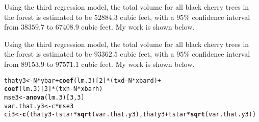 \documentclass[12pt]{article}\usepackage[]{graphicx}\usepackage[]{color}
\makeatletter
\newcommand{\hlnum}[1]{\textcolor[rgb]{0.686,0.059,0.569}{#1}}%
\newcommand{\hlopt}[1]{\textcolor[rgb]{0,0,0}{#1}}%
\newcommand{\hlstd}[1]{\textcolor[rgb]{0.345,0.345,0.345}{#1}}%
\newcommand{\hlkwb}[1]{\textcolor[rgb]{0.69,0.353,0.396}{#1}}%
\newcommand{\hlkwd}[1]{\textcolor[rgb]{0.737,0.353,0.396}{\textbf{#1}}}%
\newenvironment{kframe}{%
 \def\at@end@of@kframe{}%
 \ifinner\ifhmode%
  \def\at@end@of@kframe{\end{minipage}}%
  \begin{minipage}{\columnwidth}%
 \fi\fi%
 \def\FrameCommand##1{\hskip\@totalleftmargin \hskip-\fboxsep
 \colorbox{shadecolor}{##1}\hskip-\fboxsep
     \hskip-\linewidth \hskip-\@totalleftmargin \hskip\columnwidth}%
 \MakeFramed {\advance\hsize-\width
   \@totalleftmargin\z@ \linewidth\hsize
   \@setminipage}}%
 {\par\unskip\endMakeFramed%
 \at@end@of@kframe}
\newenvironment{knitrout}{}{} %
\makeatother
\begin{document}
\begin{doublespacing}
\begin{enumerate}
\begin{enumerate}
Using the third regression model, the total volume for all black cherry trees in the forest is estimated to be $52884.3$ cubic feet, with a $95\%$ confidence interval from $38359.7$ to $67408.9$ cubic feet. My work is shown below.


Using the third regression model, the total volume for all black cherry trees in the forest is estimated to be $93362.5$ cubic feet, with a $95\%$ confidence interval from $89153.9$ to $97571.1$ cubic feet. My work is shown below.

\begin{singlespace}
\begin{knitrout}\footnotesize
{}\color{fgcolor}\begin{kframe}
\begin{alltt}
\hlstd{thaty3} \hlkwb{<-} \hlstd{N} \hlopt{*} \hlstd{ybar} \hlopt{+} \hlkwd{coef}\hlstd{(lm.3)[}\hlnum{2}\hlstd{]} \hlopt{*} \hlstd{(txd} \hlopt{-} \hlstd{N} \hlopt{*} \hlstd{xbard)} \hlopt{+}
                    \hlkwd{coef}\hlstd{(lm.3)[}\hlnum{3}\hlstd{]} \hlopt{*} \hlstd{(txh} \hlopt{-} \hlstd{N} \hlopt{*} \hlstd{xbarh)}
\hlstd{mse3} \hlkwb{<-} \hlkwd{anova}\hlstd{(lm.3)[}\hlnum{3}\hlstd{,} \hlnum{3}\hlstd{]}
\hlstd{var.that.y3} \hlkwb{<-} \hlstd{c} \hlopt{*} \hlstd{mse3}
\hlstd{ci3} \hlkwb{<-} \hlkwd{c}\hlstd{(thaty3} \hlopt{-} \hlstd{tstar} \hlopt{*} \hlkwd{sqrt}\hlstd{(var.that.y3), thaty3} \hlopt{+} \hlstd{tstar} \hlopt{*} \hlkwd{sqrt}\hlstd{(var.that.y3))}
\end{alltt}
\end{kframe}
\end{knitrout}
\end{singlespace}


\end{enumerate}
\end{enumerate}
\end{doublespacing}
\end{document}
